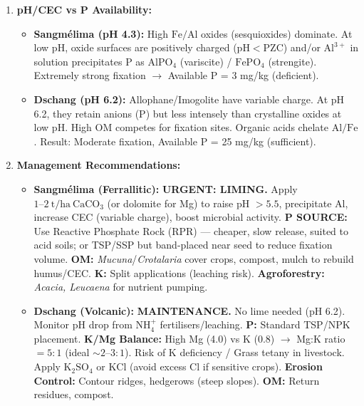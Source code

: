 \documentclass[11pt]{article}
\begin{document}
\begin{exoresolu}
\begin{enumerate}
\begin{itemize}
            \item \textbf{Sangmélima:} Strongly acidic, Low OM/N, Very Low CEC, Very Low bases, High $\mathrm{Al}$ (toxic!), Very Low BS (18\%). \textbf{Very low inherent fertility.} Fertility entirely dependent on the thin humus layer. High $\mathrm{Al}$ saturation ($= 1.8/4.5 = 40\%$) explains root stunting.
        \end{itemize}
    \item \textbf{pH/CEC vs P Availability:}
        \begin{itemize}
            \item \textbf{Sangmélima (pH 4.3):} High $\mathrm{Fe/Al}$ oxides (sesquioxides) dominate. At low pH, oxide surfaces are positively charged ($\mathrm{pH} < \mathrm{PZC}$) and/or $\mathrm{Al^{3+}}$ in solution precipitates P as $\mathrm{AlPO_4}$ (variscite) / $\mathrm{FePO_4}$ (strengite). Extremely strong fixation $\to$ Available P = 3 mg/kg (deficient).
            \item \textbf{Dschang (pH 6.2):} Allophane/Imogolite have variable charge. At pH 6.2, they retain anions (P) but less intensely than crystalline oxides at low pH. High OM competes for fixation sites. Organic acids chelate $\mathrm{Al/Fe}$. Result: Moderate fixation, Available P = 25 mg/kg (sufficient).
        \end{itemize}
    \item \textbf{Management Recommendations:}
        \begin{itemize}
            \item \textbf{Sangmélima (Ferrallitic):} \textbf{URGENT: LIMING.} Apply $1\text{--}2\ \mathrm{t/ha}\ \mathrm{CaCO_3}$ (or dolomite for Mg) to raise pH $> 5.5$, precipitate $\mathrm{Al}$, increase CEC (variable charge), boost microbial activity. \textbf{P SOURCE:} Use Reactive Phosphate Rock (RPR) — cheaper, slow release, suited to acid soils; or TSP/SSP but band-placed near seed to reduce fixation volume. \textbf{OM:} \emph{Mucuna}/\emph{Crotalaria} cover crops, compost, mulch to rebuild humus/CEC. \textbf{K:} Split applications (leaching risk). \textbf{Agroforestry:} \emph{Acacia, Leucaena} for nutrient pumping.
            \item \textbf{Dschang (Volcanic):} \textbf{MAINTENANCE.} No lime needed (pH 6.2). Monitor pH drop from $\mathrm{NH_4^+}$ fertilisers/leaching. \textbf{P:} Standard TSP/NPK placement. \textbf{K/Mg Balance:} High Mg (4.0) vs K (0.8) $\to$ Mg:K ratio $= 5:1$ (ideal $\sim 2\text{--}3:1$). Risk of K deficiency / Grass tetany in livestock. Apply $\mathrm{K_2SO_4}$ or $\mathrm{KCl}$ (avoid excess Cl if sensitive crops). \textbf{Erosion Control:} Contour ridges, hedgerows (steep slopes). \textbf{OM:} Return residues, compost.
        \end{itemize}
\end{enumerate}
\end{exoresolu}
\end{document}
